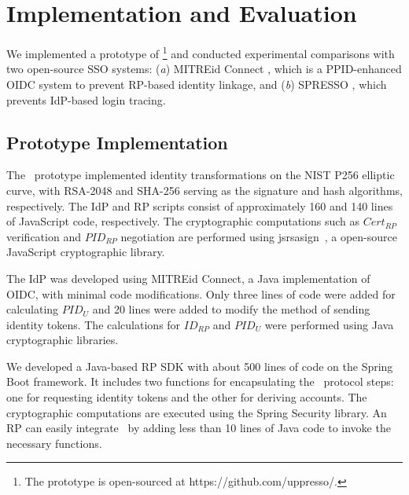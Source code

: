 \section{Implementation and Evaluation}
\label{sec:implementation}

We implemented a prototype of \usso\footnote{The prototype is open-sourced at https://github.com/uppresso/.} and conducted experimental comparisons with two open-source SSO systems: (\emph{a}) MITREid Connect \cite{MITREid}, which is a PPID-enhanced OIDC system to prevent RP-based identity linkage, and (\emph{b}) SPRESSO \cite{SPRESSO}, which prevents IdP-based login tracing.


\subsection{Prototype Implementation}
\label{subsec:proto-imple}

The \usso~prototype implemented identity transformations on the NIST P256 elliptic curve, with RSA-2048 and SHA-256 serving as the signature and hash algorithms, respectively. The IdP and RP scripts consist of approximately 160 and 140 lines of JavaScript code, respectively.  %
The cryptographic computations such as $Cert_{RP}$ verification and $PID_{RP}$ negotiation are performed using jsrsasign~\cite{jsrsasign}, a open-source JavaScript cryptographic library.

The IdP was developed using MITREid Connect\cite{MITREid}, a Java implementation of OIDC, %
with minimal code modifications. Only three lines of code were added for calculating $PID_U$ and 20 lines were added to modify the method of sending identity tokens. The calculations for $ID_{RP}$ and $PID_U$ were performed using Java cryptographic libraries.

We developed a Java-based RP SDK with about 500 lines of code on the Spring Boot framework. It includes two functions for encapsulating the \usso~protocol steps: one for requesting identity tokens and the other for deriving accounts. The cryptographic computations are executed using the Spring Security library.
An RP can easily integrate \usso~by  adding less than 10 lines of Java code to invoke the necessary functions.
